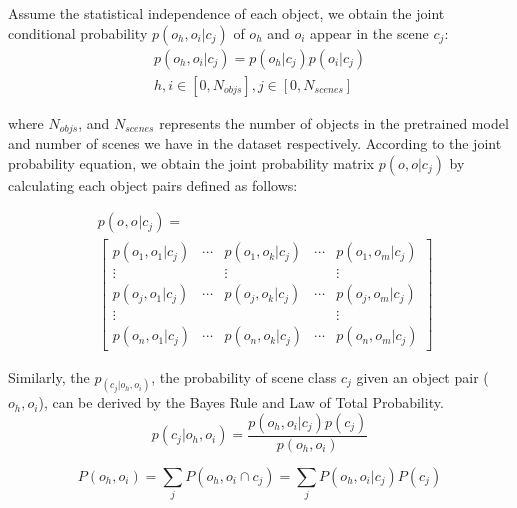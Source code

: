 Assume the statistical independence of each object, we obtain the joint conditional probability $p\left(o_{h}, o_{i} | c_{j}\right)$ of $o_h$ and $o_i$ appear in the scene $c_j$:
\begin{equation}
\begin{split}
p\left(o_{h}, o_{i} | c_{j}\right) = p\left(o_{h} | c_{j}\right) p\left(o_{i} | c_{j}\right)\label{joint probability} \\
h, i \in [0,N_{objs}], j \in [0,N_{scenes}]
\end{split}
\end{equation}

where $N_{objs}$, and $N_{scenes}$ represents the number of objects in the pretrained model and number of scenes we have in the dataset respectively. According to the joint probability equation, we obtain the joint probability matrix $p(o,o|c_j)$ by calculating each object pairs defined as follows:

\begin{equation}
\begin{split}
& p\left(o_{}, o_{} | c_{j}\right) = \\
& \begin{bmatrix}
p\left(o_{1}, o_{1} | c_{j}\right) & \cdots & p\left(o_{1},o_{k}| c_{j}\right) & \cdots & p\left(o_{1}, o_{m}| c_{j}\right) \\
\vdots &  & \vdots &  & \vdots \\
p\left(o_{j}, o_{1} | c_{j}\right) & \cdots & p\left(o_{j},o_{k}| c_{j}\right) & \cdots & p\left(o_{j},o_{m}| c_{j}\right) \\
\vdots &  &  &  & \vdots \\
p\left(o_{n}, o_{1} | c_{j}\right) & \cdots & p\left(o_{n},o_{k}| c_{j}\right) & \cdots  & p\left(o_{n}, o_{m} | c_{j}\right)
\end{bmatrix}
\end{split}
\end{equation}

Similarly, the  $p_(c_{j}|o_{h},o_{i})$, the probability of scene class $c_{j}$ given an object pair ($o_{h},o_{i}$), can be derived by the Bayes Rule and Law of Total Probability.
\begin{equation}
p\left(c_{j} | o_{h},o_{i}\right)=\frac{p\left(o_{h},o_{i} | c_{j}\right) p\left(c_{j}\right)}{p(o_{h},o_{i})}
\end{equation}

\begin{equation}
P(o_{h},o_{i})=\sum_{j} P\left(o_{h},o_{i} \cap c_{j}\right)=\sum_{j} P\left(o_{h},o_{i} | c_{j}\right) P\left(c_{j}\right)
\end{equation}

